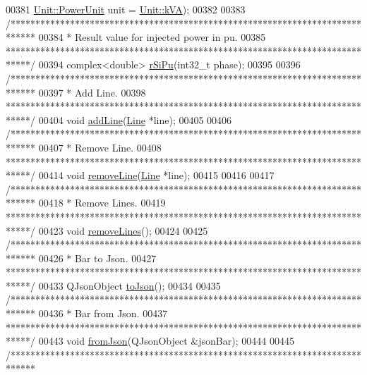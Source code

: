 \begin{DoxyCode}
00381               \hyperlink{class_unit_ace265ae255370ccacfd5370337572c3b}{Unit::PowerUnit} unit = \hyperlink{class_unit_ace265ae255370ccacfd5370337572c3ba72b181a842ae2759488a2fa1410d3696}{Unit::kVA});
00382 
00383   \textcolor{comment}{/*****************************************************************************}
00384 \textcolor{comment}{  * Result value for injected power in pu.}
00385 \textcolor{comment}{  *****************************************************************************/}
00394   complex<double> \hyperlink{group___models_ga1fa1b99d17dd19fafcf8309aba4fc758}{rSiPu}(int32\_t phase);
00395 
00396   \textcolor{comment}{/*****************************************************************************}
00397 \textcolor{comment}{  * Add Line.}
00398 \textcolor{comment}{  *****************************************************************************/}
00404   \textcolor{keywordtype}{void} \hyperlink{group___models_ga8cbd2f62d92e69ce6c8d561b682464b6}{addLine}(\hyperlink{class_line}{Line} *line);
00405 
00406   \textcolor{comment}{/*****************************************************************************}
00407 \textcolor{comment}{  * Remove Line.}
00408 \textcolor{comment}{  *****************************************************************************/}
00414   \textcolor{keywordtype}{void} \hyperlink{group___models_ga2536c0e5cb97fb627b3520826ece2c99}{removeLine}(\hyperlink{class_line}{Line} *line);
00415 
00416 
00417   \textcolor{comment}{/*****************************************************************************}
00418 \textcolor{comment}{  * Remove Lines.}
00419 \textcolor{comment}{  *****************************************************************************/}
00423   \textcolor{keywordtype}{void} \hyperlink{group___models_ga4ea1a2074cb45968d80d6add571884a4}{removeLines}();
00424 
00425   \textcolor{comment}{/*****************************************************************************}
00426 \textcolor{comment}{  * Bar to Json.}
00427 \textcolor{comment}{  *****************************************************************************/}
00433   QJsonObject \hyperlink{group___models_ga3eb84c42b687db6cd98e11b8bd38c86e}{toJson}();
00434 
00435   \textcolor{comment}{/*****************************************************************************}
00436 \textcolor{comment}{  * Bar from Json.}
00437 \textcolor{comment}{  *****************************************************************************/}
00443   \textcolor{keywordtype}{void} \hyperlink{group___models_ga1df62f03dd3a066ceaf6588ba6bb6004}{fromJson}(QJsonObject &jsonBar);
00444 
00445   \textcolor{comment}{/*****************************************************************************}

\end{DoxyCode}
